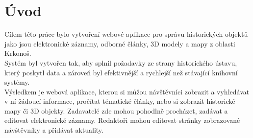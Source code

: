 \chapter{Úvod}
Cílem této práce bylo vytvoření webové aplikace pro správu historických
objektů jako jsou elektronické záznamy, odborné články, 3D modely a mapy
z oblasti Krkonoš. \\
Systém byl vytvořen tak, aby splnil požadavky ze
strany historického ústavu, který poskytl data a zároveň byl efektivnější
a rychlejší než stávající knihovní systémy.\\
Výsledkem je webová aplikace,
kterou si můžou návštěvníci zobrazit a vyhledávat v ní žádoucí informace,
pročítat tématické články, nebo si zobrazit historické mapy či 3D objekty.
Zadavatelé zde mohou pohodlně procházet, zadávat a editovat elektronické záznamy.
Redaktoři mohou editovat stránky zobrazované návštěvníky a přidávat aktuality.

